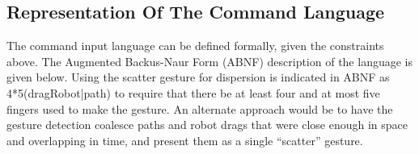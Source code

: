 \subsection{Representation Of The Command Language}
The command input language can be defined formally, given the constraints above. The Augmented Backus-Naur Form (ABNF) description of the language is given below. Using the scatter gesture for dispersion is indicated in ABNF as 4*5(dragRobot|path) to require that there be at least four and at most five fingers used to make the gesture. 
An alternate approach would be to have the gesture detection coalesce paths and robot drags that were close enough in space and overlapping in time, and present them as a single ``scatter'' gesture. 

\newenvironment{bnfsplit}[1][0.7\textwidth]
{\minipage[t]{#1}$}
{$\endminipage}

